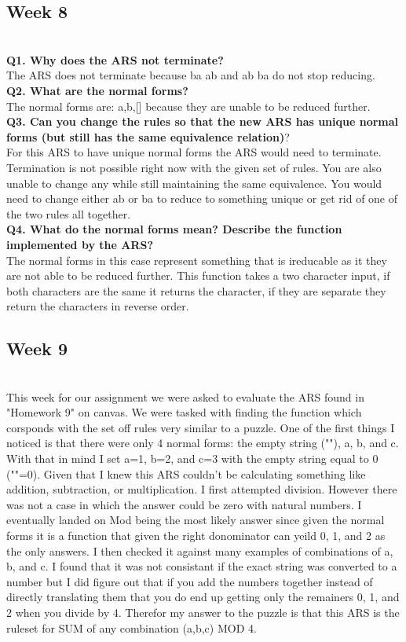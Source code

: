 \documentclass{article}
\theoremstyle{theorem}
\theoremstyle{definition}
\theoremstyle{remark}
\begin{document}
\subsection{Week 8}
\\\textbf{Q1. Why does the ARS not terminate?}
\\The ARS does not terminate because ba \rightarrow ab and ab \rightarrow ba do not stop reducing.
\\\textbf{Q2. What are the normal forms?} 
\\The normal forms are: a,b,[] because they are unable to be reduced further.
\\\textbf{Q3. Can you change the rules so that the new ARS has unique normal forms (but still has the same equivalence relation)}?
\\For this ARS to have unique normal forms the ARS would need to terminate. Termination is not possible right now with the given set of rules. You are also unable to change any while still maintaining the same equivalence. You would need to change either ab or ba to reduce to something unique or get rid of one of the two rules all together.
\\\textbf{Q4. What do the normal forms mean? Describe the function implemented by the ARS?}
\\The normal forms in this case represent something that is ireducable as it they are not able to be reduced further. This function takes a two character input, if both characters are the same it returns the character, if they are separate they return the characters in reverse order.
\subsection{Week 9}
\\This week for our assignment we were asked to evaluate the ARS found in "Homework 9" on canvas. We were tasked with finding the function which corsponds with the set off
rules very similar to a puzzle. One of the first things I noticed is that there were only 4 normal forms: the empty string (""), a, b, and c. With that in mind I set a=1, b=2, and c=3 with the empty string equal to 0 (""=0). Given that I knew this ARS couldn't be 
calculating something like addition, subtraction, or multiplication. I first attempted division. However there was not a case in which the answer could be zero with natural numbers. 
I eventually landed on Mod being the most likely answer since given the normal forms it is a function that given the right donominator can yeild 0, 1, and 2 as the only answers. I then checked it against many examples of combinations of a, b, and c.
I found that it was not consistant if the exact string was converted to a number but I did figure out that if you add the numbers together instead of directly translating them that you do end up getting only the remainers 0, 1, and 2 when you divide by 4.
Therefor my answer to the puzzle is that this ARS is the ruleset for SUM of any combination (a,b,c) MOD 4.
\end{document}

